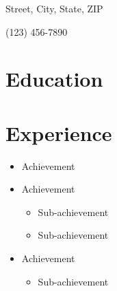 \documentclass[11pt,letterpaper]{article}
\author{John Doe}
\begin{document}
\maketitle
\thispagestyle{empty}

\begin{personal}
  \item Street, City, State, ZIP
  \item (123) 456-7890  %
  \item {}
\end{personal}

\section{Education} %



\section{Experience} %

\lipsum[1][1-4]

\begin{itemize}
  \item Achievement

  \item Achievement
  \begin{itemize}
    \item Sub-achievement
    \item Sub-achievement
  \end{itemize}

  \item Achievement
  \begin{itemize}
    \item Sub-achievement
  \end{itemize}
\end{itemize}
\lipsum[1][5-9]
\end{document}
